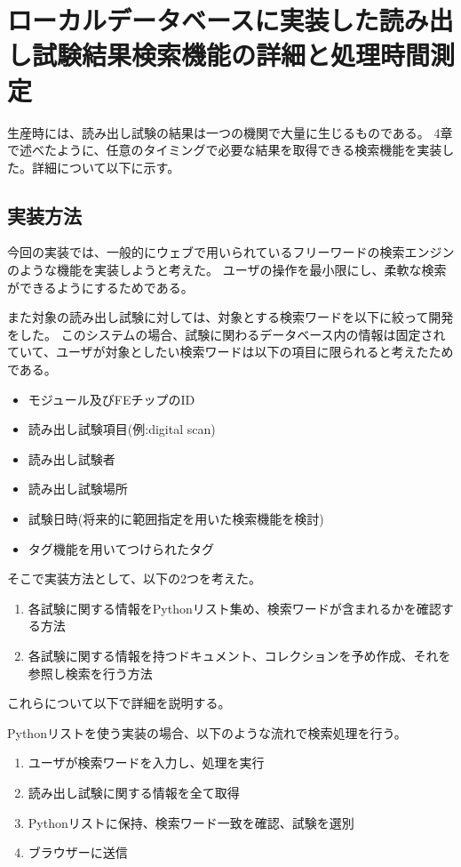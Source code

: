 \chapter{ローカルデータベースに実装した読み出し試験結果検索機能の詳細と処理時間測定}

生産時には、読み出し試験の結果は一つの機関で大量に生じるものである。
4章で述べたように、任意のタイミングで必要な結果を取得できる検索機能を実装した。詳細について以下に示す。


\section{実装方法}
今回の実装では、一般的にウェブで用いられているフリーワードの検索エンジンのような機能を実装しようと考えた。
ユーザの操作を最小限にし、柔軟な検索ができるようにするためである。

また対象の読み出し試験に対しては、対象とする検索ワードを以下に絞って開発をした。
このシステムの場合、試験に関わるデータベース内の情報は固定されていて、ユーザが対象としたい検索ワードは以下の項目に限られると考えたためである。

\begin{itemize}
  \item モジュール及びFEチップのID
  \item 読み出し試験項目(例:digital scan)
  \item 読み出し試験者
  \item 読み出し試験場所
  \item 試験日時(将来的に範囲指定を用いた検索機能を検討)
  \item タグ機能を用いてつけられたタグ
\end{itemize}

そこで実装方法として、以下の2つを考えた。

\begin{enumerate}
  \item 各試験に関する情報をPythonリスト集め、検索ワードが含まれるかを確認する方法
  \item 各試験に関する情報を持つドキュメント、コレクションを予め作成、それを参照し検索を行う方法
\end{enumerate}

これらについて以下で詳細を説明する。

Pythonリストを使う実装の場合、以下のような流れで検索処理を行う。
\begin{enumerate}
  \item ユーザが検索ワードを入力し、処理を実行
  \item 読み出し試験に関する情報を全て取得
  \item Pythonリストに保持、検索ワード一致を確認、試験を選別
  \item ブラウザーに送信
\end{enumerate}

